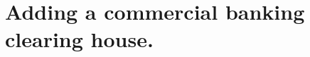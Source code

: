 \documentclass[20pt]{article}
\begin{document}

\section{Adding a commercial banking clearing house.}
\begin{screen}
\newpage
\end{screen}
\end{document}
